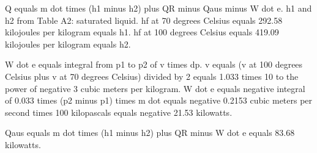 Q equals m dot times (h1 minus h2) plus QR minus Qaus minus W dot e.  
h1 and h2 from Table A2: saturated liquid.  
hf at 70 degrees Celsius equals 292.58 kilojoules per kilogram equals h1.  
hf at 100 degrees Celsius equals 419.09 kilojoules per kilogram equals h2.  

W dot e equals integral from p1 to p2 of v times dp.  
v equals (v at 100 degrees Celsius plus v at 70 degrees Celsius) divided by 2 equals 1.033 times 10 to the power of negative 3 cubic meters per kilogram.  
W dot e equals negative integral of 0.033 times (p2 minus p1) times m dot equals negative 0.2153 cubic meters per second times 100 kilopascals equals negative 21.53 kilowatts.  

Qaus equals m dot times (h1 minus h2) plus QR minus W dot e equals 83.68 kilowatts.